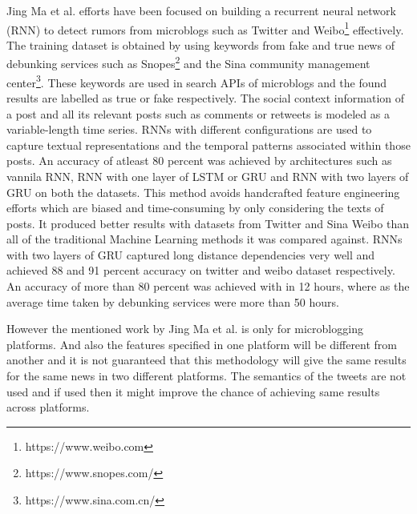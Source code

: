 \documentclass[a4paper, 11pt]{article}
\begin{document}
Jing Ma et al.\cite{Ma} efforts have been focused on building a recurrent neural network (RNN) to detect rumors from microblogs such as Twitter and Weibo\footnote{https://www.weibo.com} effectively. The training dataset is obtained by using keywords from fake and true news of debunking services such as Snopes\footnote{https://www.snopes.com/} and the Sina community management center\footnote{https://www.sina.com.cn/}. These keywords are used in search APIs of microblogs and the found results are labelled as true or fake respectively. The social context information of a post and all its relevant posts such as comments or retweets is modeled as a variable-length time series. RNNs with different configurations are used to capture textual representations and the temporal patterns associated within those posts. An accuracy of atleast 80 percent was achieved by architectures such as vannila RNN, RNN with one layer of LSTM or GRU and RNN with two layers of GRU on both the datasets. This method avoids handcrafted feature engineering efforts which are biased and time-consuming by only considering the texts of posts. It produced better results with datasets from Twitter and Sina Weibo than all of the traditional Machine Learning methods it was compared against. RNNs with two layers of GRU captured long distance dependencies very well and achieved 88 and 91 percent accuracy on twitter and weibo dataset respectively. An accuracy of more than 80 percent was achieved with in 12 hours, where as the average time taken by debunking services were more than 50 hours.

However the mentioned work by Jing Ma et al. is only for microblogging platforms. And also the features specified in one platform will be different from another and it is not guaranteed that this methodology will give the same results for the same news in two different platforms. The semantics of the tweets are not used and if used then it might improve the chance of achieving same results across platforms.
\end{document}
